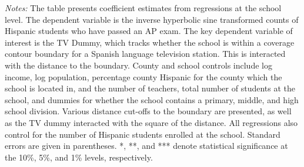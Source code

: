 \begin{table}[!h]
{\begin{threeparttable}
			\begin{tablenotes}[flushleft]
				\item \textit{Notes:} The table presents coefficient estimates from regressions at the school level. The dependent variable is the inverse hyperbolic sine transformed counts of Hispanic students who have passed an AP exam. The key dependent variable of interest is the TV Dummy, which tracks whether the school is within a coverage contour boundary for a Spanish language television station. This is interacted with the distance to the boundary. County and school controls include log income, log population, percentage county Hispanic for the county which the school is located in, and the number of teachers, total number of students at the school, and dummies for whether the school contains a primary, middle, and high school division. Various distance cut-offs to the boundary are presented, as well as the TV dummy interacted with the square of the distance. All regressions also control for the number of Hispanic students enrolled at the school. Standard errors are given in parentheses. *, **, and *** denote statistical significance at the 10\%, 5\%, and 1\% levels, respectively.
			\end{tablenotes}
		\end{threeparttable}
	}
\end{table}
